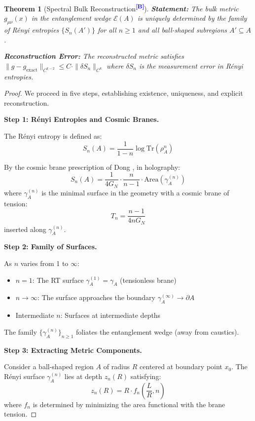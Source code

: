 \documentclass[12pt,a4paper]{article}
\newtheorem{theorem}{Theorem}[section]
\newcommand{\levelB}{\textsuperscript{\textcolor{blue}{\textbf{[B]}}}}
\begin{document}
\begin{theorem}[Spectral Bulk Reconstruction\levelB]
\textbf{Statement:}
The bulk metric $g_{\mu\nu}(x)$ in the entanglement wedge $\mathcal{E}(A)$ is uniquely determined by the family of R\'enyi entropies $\{S_n(A')\}$ for all $n \geq 1$ and all ball-shaped subregions $A' \subseteq A$.

\textbf{Reconstruction Error:}
The reconstructed metric satisfies $\|g - g_{\text{exact}}\|_{C^{k-2}} \leq C \cdot \|\delta S_n\|_{C^k}$ where $\delta S_n$ is the measurement error in R\'enyi entropies.
\end{theorem}

\begin{proof}
We proceed in five steps, establishing existence, uniqueness, and explicit reconstruction.

\textbf{Step 1: R\'enyi Entropies and Cosmic Branes.}

The R\'enyi entropy is defined as:
\begin{equation}
S_n(A) = \frac{1}{1-n}\log \text{Tr}(\rho_A^n)
\end{equation}

By the cosmic brane prescription of Dong \cite{dong2016}, in holography:
\begin{equation}
S_n(A) = \frac{1}{4G_N} \cdot \frac{n}{n-1} \cdot \text{Area}(\gamma_A^{(n)})
\end{equation}
where $\gamma_A^{(n)}$ is the minimal surface in the geometry with a cosmic brane of tension:
\begin{equation}
T_n = \frac{n-1}{4nG_N}
\end{equation}
inserted along $\gamma_A^{(n)}$.

\textbf{Step 2: Family of Surfaces.}

As $n$ varies from 1 to $\infty$:
\begin{itemize}
    \item $n = 1$: The RT surface $\gamma_A^{(1)} = \gamma_A$ (tensionless brane)
    \item $n \to \infty$: The surface approaches the boundary $\gamma_A^{(\infty)} \to \partial A$
    \item Intermediate $n$: Surfaces at intermediate depths
\end{itemize}

The family $\{\gamma_A^{(n)}\}_{n \geq 1}$ foliates the entanglement wedge (away from caustics).

\textbf{Step 3: Extracting Metric Components.}

Consider a ball-shaped region $A$ of radius $R$ centered at boundary point $x_0$. The R\'enyi surface $\gamma_A^{(n)}$ lies at depth $z_n(R)$ satisfying:
\begin{equation}
z_n(R) = R \cdot f_n\left(\frac{L}{R}, n\right)
\end{equation}
where $f_n$ is determined by minimizing the area functional with the brane tension.


\end{proof}
\end{document}
